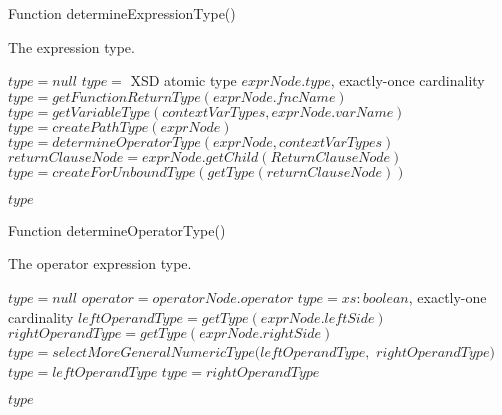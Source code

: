 \begin{algorithm}
\caption{Function determineExpressionType()}
\label{ALG_func_determineExpressionType}
\begin{algorithmic}[1]
\ENSURE The expression type.

\STATE $type = null$
     \STATE $type =$ XSD atomic type $exprNode.type$, exactly-once cardinality
     \STATE $type = getFunctionReturnType(exprNode.fncName)$
     \STATE $type = getVariableType(contextVarTypes, exprNode.varName)$
     \STATE $type = createPathType(exprNode)$
     \STATE $type = determineOperatorType(exprNode, contextVarTypes)$
     \STATE $returnClauseNode = exprNode.getChild(ReturnClauseNode)$
     \STATE $type = createForUnboundType(getType(returnClauseNode))$
\ENDIF

\RETURN $type$
\end{algorithmic}
\end{algorithm}

\begin{algorithm}
\caption{Function determineOperatorType()}
\label{ALG_func_determineOperatorType}
\begin{algorithmic}[1]
\ENSURE The operator expression type.

\STATE $type = null$
\STATE $operator = operatorNode.operator$
    \STATE $type = xs:boolean$, exactly-one cardinality
    \STATE $leftOperandType = getType(exprNode.leftSide)$
    \STATE $rightOperandType = getType(exprNode.rightSide)$
        \STATE $type = selectMoreGeneralNumericType(leftOperandType,$ $rightOperandType)$
        \STATE $type = leftOperandType$
        \STATE $type = rightOperandType$
    \ENDIF
\ENDIF

\RETURN $type$
\end{algorithmic}
\end{algorithm}

